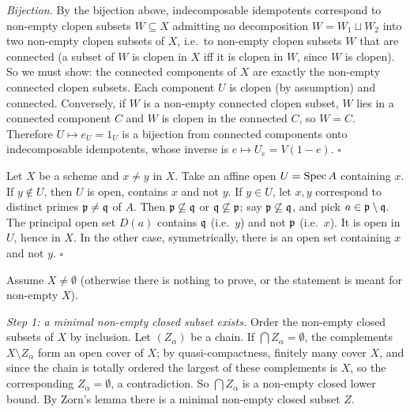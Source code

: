 \documentclass[11pt]{article}
\begin{document}
\emph{Bijection.} By the bijection above, indecomposable idempotents correspond to non-empty clopen subsets $W\subseteq X$ admitting no decomposition $W=W_1\sqcup W_2$ into two non-empty clopen subsets of $X$, i.e.\ to non-empty clopen subsets $W$ that are connected (a subset of $W$ is clopen in $X$ iff it is clopen in $W$, since $W$ is clopen). So we must show: the connected components of $X$ are exactly the non-empty connected clopen subsets. Each component $U$ is clopen (by assumption) and connected. Conversely, if $W$ is a non-empty connected clopen subset, $W$ lies in a connected component $C$ and $W$ is clopen in the connected $C$, so $W=C$. Therefore $U\mapsto e_U=1_U$ is a bijection from connected components onto indecomposable idempotents, whose inverse is $e\mapsto U_e=V(1-e)$. \hfill$\square$

\pf
Let $X$ be a scheme and $x\neq y$ in $X$. Take an affine open $U=\operatorname{Spec} A$ containing $x$. If $y\notin U$, then $U$ is open, contains $x$ and not $y$. If $y\in U$, let $x,y$ correspond to distinct primes $\mathfrak p\ne\mathfrak q$ of $A$. Then $\mathfrak p\not\subseteq\mathfrak q$ or $\mathfrak q\not\subseteq\mathfrak p$; say $\mathfrak p\not\subseteq\mathfrak q$, and pick $a\in\mathfrak p\setminus\mathfrak q$. The principal open set $D(a)$ contains $\mathfrak q$ (i.e.\ $y$) and not $\mathfrak p$ (i.e.\ $x$). It is open in $U$, hence in $X$. In the other case, symmetrically, there is an open set containing $x$ and not $y$. \hfill$\square$

\pf
Assume $X\ne\emptyset$ (otherwise there is nothing to prove, or the statement is meant for non-empty $X$).

\emph{Step 1: a minimal non-empty closed subset exists.} Order the non-empty closed subsets of $X$ by inclusion. Let $(Z_\alpha)$ be a chain. If $\bigcap Z_\alpha=\emptyset$, the complements $X\setminus Z_\alpha$ form an open cover of $X$; by quasi-compactness, finitely many cover $X$, and since the chain is totally ordered the largest of these complements is $X$, so the corresponding $Z_\alpha=\emptyset$, a contradiction. So $\bigcap Z_\alpha$ is a non-empty closed lower bound. By Zorn's lemma there is a minimal non-empty closed subset $Z$.
\end{document}
